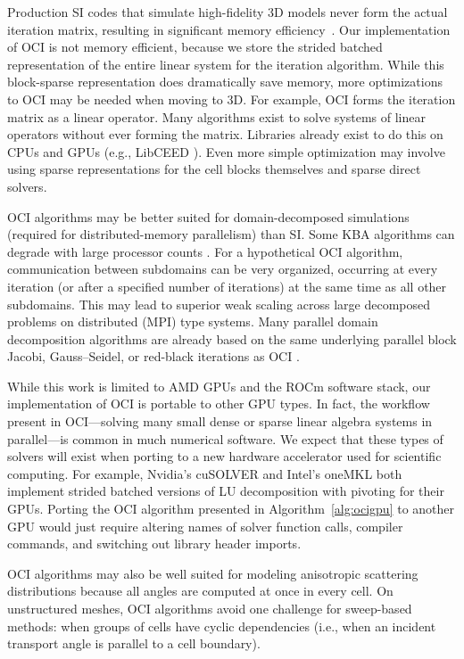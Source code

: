 Production SI codes that simulate high-fidelity 3D models never form the actual iteration matrix, resulting in significant memory efficiency~\cite{partisn, evans_denovo_2010, kunen_porting_2019, MINARET, wang_necp_hydra_2020, ShemonEmilyR.2016PUM}.
Our implementation of OCI is not memory efficient, because we store the strided batched representation of the entire linear system for the iteration algorithm.
While this block-sparse representation does dramatically save memory, more optimizations to OCI may be needed when moving to 3D.
For example, OCI forms the iteration matrix as a linear operator.
Many algorithms exist to solve systems of linear operators without ever forming the matrix.
Libraries already exist to do this on CPUs and GPUs (e.g., LibCEED \cite{libceed-joss-paper}).
Even more simple optimization may involve using sparse representations for the cell blocks themselves and sparse direct solvers.


OCI algorithms may be better suited for domain-decomposed simulations (required for distributed-memory parallelism) than SI.
Some KBA algorithms can degrade with large processor counts \cite{baker_kba_2017}.
For a hypothetical OCI algorithm, communication between subdomains can be very organized, occurring at every iteration (or after a specified number of iterations) at the same time as all other subdomains.
This may lead to superior weak scaling across large decomposed problems on distributed (MPI) type systems.
Many parallel domain decomposition algorithms are already based on the same underlying parallel block Jacobi, Gauss--Seidel, or red-black iterations as OCI \cite{anistratov_iterative_2015, compeig2019ani}.

While this work is limited to AMD GPUs and the ROCm software stack, our implementation of OCI is portable to other GPU types.
In fact, the workflow present in OCI---solving many small dense or sparse linear algebra systems in parallel---is common in much numerical software.
We expect that these types of solvers will exist when porting to a new hardware accelerator used for scientific computing.
For example, Nvidia's cuSOLVER \cite{cuSovler} and Intel's oneMKL \cite{oneMKL} both implement strided batched versions of LU decomposition with pivoting for their GPUs.
Porting the OCI algorithm presented in Algorithm~\ref{alg:ocigpu} to another GPU would just require altering names of solver function calls, compiler commands, and switching out library header imports.

OCI algorithms may also be well suited for modeling anisotropic scattering distributions because all angles are computed at once in every cell.
On unstructured meshes, OCI algorithms avoid one challenge for sweep-based methods: when groups of cells have cyclic dependencies (i.e., when an incident transport angle is parallel to a cell boundary).

